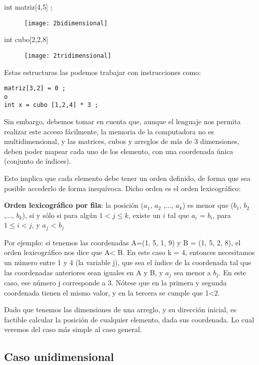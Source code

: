 int matriz[4,5] ;

\begin{figure}[H]
  \centering
  \texttt{[image: 2bidimensional]}
\end{figure}

int cubo[2,2,8]
\begin{figure}[H]
  \centering
  \texttt{[image: 2tridimensional]}
\end{figure}

Estas estructuras las podemos trabajar con instrucciones como:

\begin{verbatim}
matriz[3,2] = 0 ;
o
int x = cubo [1,2,4] * 3 ;
\end{verbatim}

Sin embargo, debemos tomar en cuenta que, aunque el lenguaje nos
permita realizar este acceso fácilmente, la memoria de la computadora
no es multidimensional, y las matrices, cubos y arreglos de más de 3
dimensiones, deben poder mapear cada uno de los elemento, con una
coordenada única (conjunto de índices).

Esto implica que cada elemento debe tener un orden definido, de forma
que sea posible accederlo de forma inequívoca.  Dicho orden es el
orden lexicográfico:

\begin{definicion}
  \textbf{Orden lexicográfico por fila}: la posición ($a_1$, $a_2$
  ,..., $a_k$) es menor que ($b_1$, $b_2$,..., $b_k$), si y sólo si
  para algún $1 < j \leq k$, existe un $i$ tal que $a_i$ = $b_i$, para
  $1 \leq i < j$, y $a_j$ < $b_j$
\end{definicion}

Por ejemplo: si tenemos las coordenadas A=(1, 5, 1, 9) y B = (1, 5, 2,
8), el orden lexicográfico nos dice que A< B. En este caso k = 4,
entonces necesitamos un número entre 1 y 4 (la variable j), que sea el
índice de la coordenada tal que las coordenadas anteriores sean
iguales en A y B, y $a_j$ sea menor a $b_j$. En este caso, ese número
j corresponde a 3. Nótese que en la primera y segunda coordenada
tienen el mismo valor, y en la tercera se cumple que 1<2.

Dado que tenemos las dimensiones de una arreglo, y su dirección
inicial, es factible calcular la posición de cualquier elemento, dada
sus coordenada.  Lo cual veremos del caso más simple al caso general.

\subsection{Caso unidimensional}
\label{sec:caso-unidimensional}

